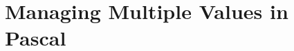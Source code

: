 \cleardoublepage
\def\pageLang{pas}
\section{Managing Multiple Values in Pascal} %
\label{sec:arrays_in_pascal}








